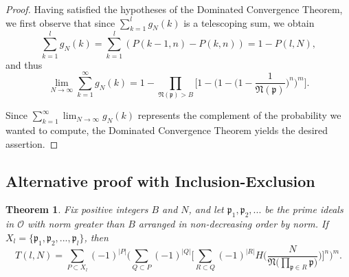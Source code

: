 \documentclass[10pt,a4paper]{article}
\newtheorem{theorem}{Theorem}[section]
\theoremstyle{definition}
\theoremstyle{remark}
\newcommand{\f}[1]{\mathfrak{#1}}
\begin{document}
\begin{proof}
Having satisfied the hypotheses of the Dominated Convergence Theorem, we first observe that since $\sum_{k=1}^l g_N(k)$ is a telescoping sum, we obtain
$$\sum_{k=1}^l g_N(k) = \sum_{k=1}^l (P(k-1, n) - P(k, n)) = 1 - P(l,N),$$ 
and thus
$$\lim_{N \to \infty} \sum_{k=1}^{\infty} g_N(k) = 1 - \prod_{\mathfrak{N}(\mathfrak{p}) > B} \Big[1 - \Big(1 - \Big(1 - \frac{1}{\mathfrak{N}(\mathfrak{p})}  \Big)^n\Big)^m\Big].$$

\noindent Since $\displaystyle \sum_{k=1}^{\infty} \lim_{N \to \infty} g_N(k)$ represents the complement of the probability we wanted to compute, the Dominated Convergence Theorem yields the desired assertion.
\end{proof}


\subsection{Alternative proof with Inclusion-Exclusion}

\begin{theorem} Fix positive integers $B$ and $N$, and let $\mathfrak{p}_1, \mathfrak{p}_2, ...$ be the prime ideals in $\mathcal{O}$ with norm greater than $B$ arranged in non-decreasing order by norm. If $X_l = \{\mathfrak{p}_1, \mathfrak{p}_2, ..., \mathfrak{p}_l\}$, then
$$T(l,N) = \sum_{P\subset X_l}(-1)^{|P|} \Big(\sum_{Q\subset P} (-1)^{|Q|} \Big[\sum_{R\subset Q}(-1)^{|R|} H\Big(\frac{N}{\f{N}\Big(\prod_{\f{p}\in R}\f{p}\Big)} \Big) \Big]^n \Big)^m.$$
\end{theorem}
\end{document}
